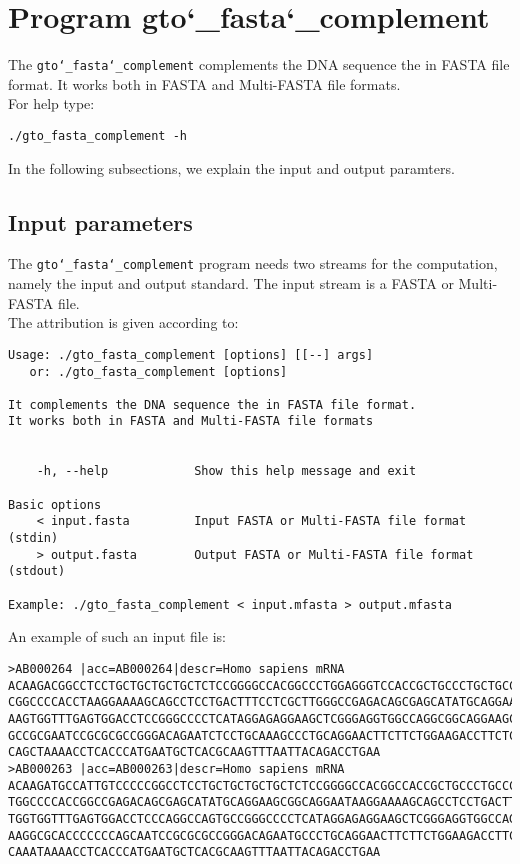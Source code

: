 \section{Program gto\char`_fasta\char`_complement}
The \texttt{gto\char`_fasta\char`_complement} complements the DNA sequence the in FASTA file format. It works both in FASTA and Multi-FASTA file formats.\\
For help type:
\begin{lstlisting}
./gto_fasta_complement -h
\end{lstlisting}
In the following subsections, we explain the input and output paramters.

\subsection*{Input parameters}

The \texttt{gto\char`_fasta\char`_complement} program needs two streams for the computation, namely the input and output standard. The input stream is a FASTA or Multi-FASTA file.\\
The attribution is given according to:
\begin{lstlisting}
Usage: ./gto_fasta_complement [options] [[--] args]
   or: ./gto_fasta_complement [options]

It complements the DNA sequence the in FASTA file format.
It works both in FASTA and Multi-FASTA file formats


    -h, --help            Show this help message and exit

Basic options
    < input.fasta         Input FASTA or Multi-FASTA file format (stdin)
    > output.fasta        Output FASTA or Multi-FASTA file format (stdout)

Example: ./gto_fasta_complement < input.mfasta > output.mfasta
\end{lstlisting}
An example of such an input file is:
\begin{lstlisting}
>AB000264 |acc=AB000264|descr=Homo sapiens mRNA 
ACAAGACGGCCTCCTGCTGCTGCTGCTCTCCGGGGCCACGGCCCTGGAGGGTCCACCGCTGCCCTGCTGCCATTGTCCC
CGGCCCCACCTAAGGAAAAGCAGCCTCCTGACTTTCCTCGCTTGGGCCGAGACAGCGAGCATATGCAGGAAGCGGCAGG
AAGTGGTTTGAGTGGACCTCCGGGCCCCTCATAGGAGAGGAAGCTCGGGAGGTGGCCAGGCGGCAGGAAGCAGGCCAGT
GCCGCGAATCCGCGCGCCGGGACAGAATCTCCTGCAAAGCCCTGCAGGAACTTCTTCTGGAAGACCTTCTCCACCCCCC
CAGCTAAAACCTCACCCATGAATGCTCACGCAAGTTTAATTACAGACCTGAA
>AB000263 |acc=AB000263|descr=Homo sapiens mRNA 
ACAAGATGCCATTGTCCCCCGGCCTCCTGCTGCTGCTGCTCTCCGGGGCCACGGCCACCGCTGCCCTGCCCCTGGAGGG
TGGCCCCACCGGCCGAGACAGCGAGCATATGCAGGAAGCGGCAGGAATAAGGAAAAGCAGCCTCCTGACTTTCCTCGCT
TGGTGGTTTGAGTGGACCTCCCAGGCCAGTGCCGGGCCCCTCATAGGAGAGGAAGCTCGGGAGGTGGCCAGGCGGCAGG
AAGGCGCACCCCCCCAGCAATCCGCGCGCCGGGACAGAATGCCCTGCAGGAACTTCTTCTGGAAGACCTTCTCCTCCTG
CAAATAAAACCTCACCCATGAATGCTCACGCAAGTTTAATTACAGACCTGAA
\end{lstlisting}

